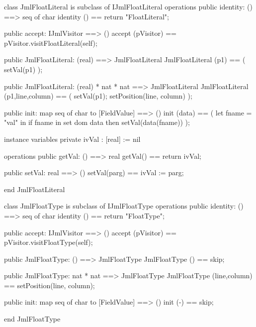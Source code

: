\begin{vdm_al}
class JmlFloatLiteral is subclass of IJmlFloatLiteral
operations
  public identity: () ==> seq of char
  identity () == return "FloatLiteral";

  public accept: IJmlVisitor ==> ()
  accept (pVisitor) == pVisitor.visitFloatLiteral(self);

  public JmlFloatLiteral:
    (real) ==> JmlFloatLiteral
  JmlFloatLiteral (p1) == 
    ( setVal(p1) );

  public JmlFloatLiteral:
    (real) *
    nat *
    nat ==> JmlFloatLiteral
  JmlFloatLiteral (p1,line,column) == 
    ( setVal(p1);
      setPosition(line, column) );

  public init: map seq of char to [FieldValue] ==> ()
  init (data) ==
    ( let fname = "val" in
        if fname in set dom data
        then setVal(data(fname)) );

instance variables
  private ivVal : [real] := nil

operations
  public getVal: () ==> real
  getVal() == return ivVal;

  public setVal: real ==> ()
  setVal(parg) == ivVal := parg;

end JmlFloatLiteral
\end{vdm_al}

\begin{vdm_al}
class JmlFloatType is subclass of IJmlFloatType
operations
  public identity: () ==> seq of char
  identity () == return "FloatType";

  public accept: IJmlVisitor ==> ()
  accept (pVisitor) == pVisitor.visitFloatType(self);

  public JmlFloatType:
    () ==> JmlFloatType
  JmlFloatType () == 
    skip;

  public JmlFloatType:
    nat *
    nat ==> JmlFloatType
  JmlFloatType (line,column) == 
    setPosition(line, column);

  public init: map seq of char to [FieldValue] ==> ()
  init (-) == skip;

end JmlFloatType
\end{vdm_al}

